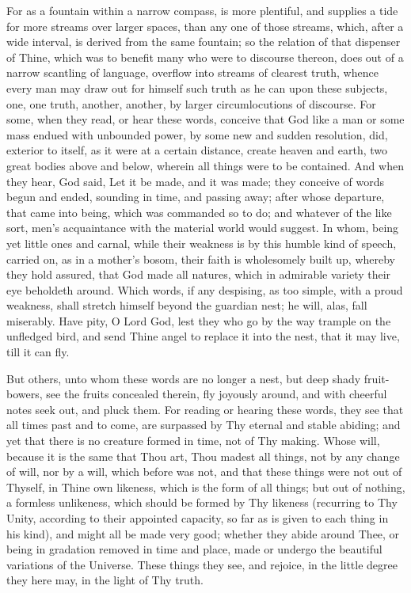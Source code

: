 \documentclass[b5paper,openright,12pt,twoside]{book}
\begin{document}
For as a fountain within a narrow compass, is more plentiful, and
supplies a tide for more streams over larger spaces, than any one of
those streams, which, after a wide interval, is derived from the same
fountain; so the relation of that dispenser of Thine, which was to
benefit many who were to discourse thereon, does out of a narrow
scantling of language, overflow into streams of clearest truth, whence
every man may draw out for himself such truth as he can upon these
subjects, one, one truth, another, another, by larger circumlocutions of
discourse. For some, when they read, or hear these words, conceive that
God like a man or some mass endued with unbounded power, by some new
and sudden resolution, did, exterior to itself, as it were at a certain
distance, create heaven and earth, two great bodies above and below,
wherein all things were to be contained. And when they hear, God said,
Let it be made, and it was made; they conceive of words begun and ended,
sounding in time, and passing away; after whose departure, that came
into being, which was commanded so to do; and whatever of the like sort,
men's acquaintance with the material world would suggest. In whom, being
yet little ones and carnal, while their weakness is by this humble
kind of speech, carried on, as in a mother's bosom, their faith is
wholesomely built up, whereby they hold assured, that God made all
natures, which in admirable variety their eye beholdeth around. Which
words, if any despising, as too simple, with a proud weakness, shall
stretch himself beyond the guardian nest; he will, alas, fall miserably.
Have pity, O Lord God, lest they who go by the way trample on the
unfledged bird, and send Thine angel to replace it into the nest, that
it may live, till it can fly.

But others, unto whom these words are no longer a nest, but deep shady
fruit-bowers, see the fruits concealed therein, fly joyously around,
and with cheerful notes seek out, and pluck them. For reading or hearing
these words, they see that all times past and to come, are surpassed by
Thy eternal and stable abiding; and yet that there is no creature formed
in time, not of Thy making. Whose will, because it is the same that Thou
art, Thou madest all things, not by any change of will, nor by a will,
which before was not, and that these things were not out of Thyself, in
Thine own likeness, which is the form of all things; but out of nothing,
a formless unlikeness, which should be formed by Thy likeness (recurring
to Thy Unity, according to their appointed capacity, so far as is given
to each thing in his kind), and might all be made very good; whether
they abide around Thee, or being in gradation removed in time and place,
made or undergo the beautiful variations of the Universe. These things
they see, and rejoice, in the little degree they here may, in the light
of Thy truth.
\end{document}

